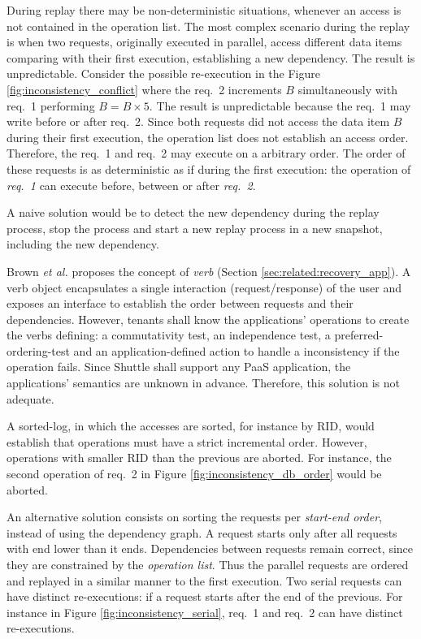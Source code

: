 During replay there may be non-deterministic situations, whenever an access is not contained in the operation list. The most complex scenario during the replay is when two requests, originally executed in parallel, access different data items comparing with their first execution, establishing a new dependency. The result is unpredictable. Consider the possible re-execution in the Figure \ref{fig:inconsistency_conflict} where the {req.~2} increments $B$ simultaneously with {req.~1} performing $B = B \times 5$. The result is unpredictable because the {req.~1} may write before or after {req.~2}. Since both requests did not access the data item $B$ during their first execution, the operation list does not establish an access order. Therefore, the {req.~1} and {req.~2} may execute on a arbitrary order. The order of these requests is as deterministic as if during the first execution: the operation of \emph{req.~1} can execute before, between or after \emph{req.~2}.


A naive solution would be to detect the new dependency during the replay process, stop the process and start a new replay process in a new snapshot, including the new dependency.

Brown \textit{et al.} \cite{undoForOperators} proposes the concept of \textit{verb} (Section \ref{sec:related:recovery_app}). A verb object encapsulates a single interaction (request/response) of the user and exposes an interface to establish the order between requests and their dependencies. However, tenants shall know the applications' operations to create the verbs defining: a commutativity test, an independence test, a preferred-ordering-test and an application-defined action to handle a inconsistency if the operation fails. Since Shuttle shall support any \ac{PaaS} application, the applications' semantics are unknown in advance. Therefore, this solution is not adequate.

A sorted-log, in which the accesses are sorted, for instance by \acf{RID}, would establish that operations must have a strict incremental order. However, operations with smaller \ac{RID} than the previous are aborted. For instance, the second operation of {req.~2} in Figure \ref{fig:inconsistency_db_order} would be aborted.

An alternative solution consists on sorting the requests per \emph{start-end order}, instead of using the dependency graph. A request starts only after all requests with end lower than it ends. Dependencies between requests remain correct, since they are constrained by the \emph{operation list}. Thus the parallel requests are ordered and replayed in a similar manner to the first execution. Two serial requests can have distinct re-executions: if a request starts after the end of the previous. For instance in Figure \ref{fig:inconsistency_serial}, {req.~1} and {req.~2} can have distinct re-executions.

